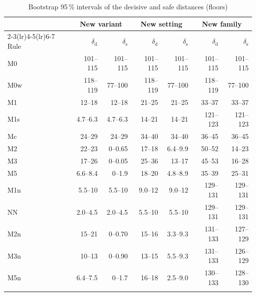 \documentclass[pdflatex,sn-basic]{sn-jnl}
\newcommand{\tabsize}{\fontsize{8}{9.5}\selectfont}
\begin{document}
\begin{table}[tbp]
\tabsize
\setlength{\tabcolsep}{4pt}
\caption{Bootstrap 95\,\% intervals of the decisive and safe distances (floors)}\label{tab:distci}
\begin{tabular}{@{}lrrrrrr@{}}
\toprule
 & \multicolumn{2}{c}{New variant} & \multicolumn{2}{c}{New setting} & \multicolumn{2}{c}{New family} \\
\cmidrule(lr){2-3}\cmidrule(lr){4-5}\cmidrule(lr){6-7}
Rule & $\delta_\mathrm{d}$ & $\delta_\mathrm{s}$ & $\delta_\mathrm{d}$ & $\delta_\mathrm{s}$ & $\delta_\mathrm{d}$ & $\delta_\mathrm{s}$ \\
\midrule
M0 & 101--115 & 101--115 & 101--115 & 101--115 & 101--115 & 101--115 \\
M0w & 118--119 & 77--100 & 118--119 & 77--100 & 118--119 & 77--100 \\
M1 & 12--18 & 12--18 & 21--25 & 21--25 & 33--37 & 33--37 \\
M1s & 4.7--6.3 & 4.7--6.3 & 14--21 & 14--21 & 121--123 & 121--123 \\
Mc & 24--29 & 24--29 & 34--40 & 34--40 & 36--45 & 36--45 \\
M2 & 22--23 & 0--0.65 & 17--18 & 6.4--9.9 & 50--52 & 14--23 \\
M3 & 17--26 & 0--0.05 & 25--36 & 13--17 & 45--53 & 16--28 \\
M5 & 6.6--8.4 & 0--1.9 & 18--20 & 4.8--8.9 & 35--39 & 25--31 \\
M1n & 5.5--10 & 5.5--10 & 9.0--12 & 9.0--12 & 129--131 & 129--131 \\
NN & 2.0--4.5 & 2.0--4.5 & 5.5--10 & 5.5--10 & 129--131 & 129--131 \\
M2n & 15--21 & 0--0.70 & 15--16 & 3.3--9.3 & 131--133 & 127--129 \\
M3n & 10--13 & 0--0.90 & 13--15 & 5.5--9.3 & 131--133 & 126--129 \\
M5n & 6.4--7.5 & 0--1.7 & 16--18 & 2.5--9.0 & 130--133 & 128--130 \\
\botrule
\end{tabular}
\end{table}
\end{document}
